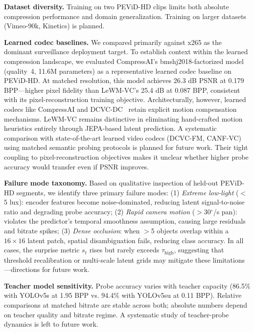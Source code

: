 \documentclass{article}
\begin{document}
\textbf{Dataset diversity.} Training on two PEViD-HD clips limits both absolute compression performance and domain generalization. Training on larger datasets (Vimeo-90k, Kinetics) is planned.

\textbf{Learned codec baselines.} We compared primarily against x265 as the dominant surveillance deployment target. To establish context within the learned compression landscape, we evaluated CompressAI's bmshj2018-factorized model~\cite{balle2018variational,begaint2020compressai} (quality~4, 11.6M parameters) as a representative learned codec baseline on PEViD-HD. At matched resolution, this model achieves 26.3 dB PSNR at 0.179 BPP---higher pixel fidelity than LeWM-VC's 25.4 dB at 0.087 BPP, consistent with its pixel-reconstruction training objective. Architecturally, however, learned codecs like CompressAI and DCVC-DC~\cite{li2022dcvcdc} retain explicit motion compensation mechanisms. LeWM-VC remains distinctive in eliminating hand-crafted motion heuristics entirely through JEPA-based latent prediction. A systematic comparison with state-of-the-art learned video codecs (DCVC-FM, CANF-VC) using matched semantic probing protocols is planned for future work. Their tight coupling to pixel-reconstruction objectives makes it unclear whether higher probe accuracy would transfer even if PSNR improves.

\textbf{Failure mode taxonomy.}
Based on qualitative inspection of held-out PEViD-HD segments, we identify three primary failure modes: (1) \textit{Extreme low-light} ($<$5 lux): encoder features become noise-dominated, reducing latent signal-to-noise ratio and degrading probe accuracy; (2) \textit{Rapid camera motion} ($>$30$^\circ$/s pan): violates the predictor's temporal smoothness assumption, causing large residuals and bitrate spikes; (3) \textit{Dense occlusion}: when $>$5 objects overlap within a $16{\times}16$ latent patch, spatial disambiguation fails, reducing class accuracy. In all cases, the surprise metric $s_t$ rises but rarely exceeds $\tau_{\text{high}}$, suggesting that threshold recalibration or multi-scale latent grids may mitigate these limitations---directions for future work.

\textbf{Teacher model sensitivity.} Probe accuracy varies with teacher capacity (86.5\% with YOLOv5s at 1.95 BPP vs. 94.4\% with YOLOv5su at 0.11 BPP). Relative comparisons at matched bitrate are stable across both; absolute numbers depend on teacher quality and bitrate regime. A systematic study of teacher-probe dynamics is left to future work.
\end{document}
